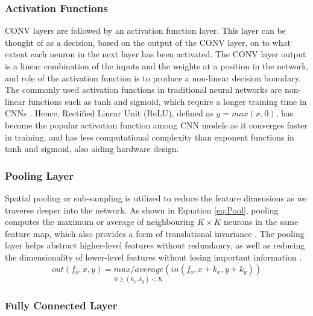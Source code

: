 \documentclass[12pt]{article}
\begin{document}
\subsubsection{Activation Functions}
\label{sec:Background-CNN-Activation}
\vspace{-12pt}

CONV layers are followed by an activation function layer. This layer can be thought of as a decision, based on the output of the CONV layer, on to what extent each neuron in the next layer has been activated. The CONV layer output is a linear combination of the inputs and the weights at a position in the network, and role of the activation function is to produce a non-linear decision boundary. The commonly used activation functions in traditional neural networks are non-linear functions such as tanh and sigmoid, which require a longer training time in CNNs \cite{AlexNet}. Hence, Rectified Linear Unit (ReLU), defined as $y = max(x,0)$, has become the popular activation function among CNN models as it converges faster in training, and has less computational complexity than exponent functions in tanh and sigmoid, also aiding hardware design.

\subsubsection{Pooling Layer}
\label{sec:Background-CNN-Pool}
\vspace{-12pt}

Spatial pooling or sub-sampling is utilized to reduce the feature dimensions as we traverse deeper into the network. As shown in Equation \ref{eq:Pool}, pooling computes the maximum or average of neighbouring $K\times K$ neurons in the same feature map, which also provides a form of translational invariance \cite{PoolAnalysis}. The pooling layer helps abstract higher-level features without redundancy, as well as reducing the dimensionality of lower-level features without losing important information \cite{SudaFpgaAccelerator}.
\begin{equation}
out(f_o,x,y)=\underset{0\geqslant (k_x,k_y)<K}{max/average}(in(f_o,x+k_x,y+k_y))
\label{eq:Pool}
\end{equation}

\subsubsection{Fully Connected Layer}
\label{sec:Background-CNN-FC}
\vspace{-12pt}
\end{document}
